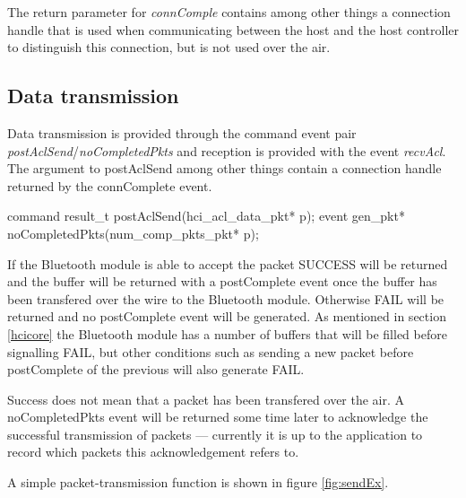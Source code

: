 \documentclass[a4paper,10pt]{article}
\begin{document}
The return parameter for \emph{connComple} contains among other things
a connection handle that is used when communicating between the host
and the host controller to distinguish this connection, but is not
used over the air.

\subsection{Data transmission}
Data transmission is provided through the command event pair
\emph{postAclSend}/\emph{noCompletedPkts} and reception is provided
with the event \emph{recvAcl}. The argument to postAclSend among other
things contain a connection handle returned by the connComplete event.

\begin{boxedverbatim}
command result_t postAclSend(hci_acl_data_pkt* p);
event gen_pkt* noCompletedPkts(num_comp_pkts_pkt* p);
\end{boxedverbatim}

If the Bluetooth module is able to accept the packet SUCCESS will be
returned and the buffer will be returned with a postComplete event
once the buffer has been transfered over the wire to the Bluetooth
module. Otherwise FAIL will be returned and no postComplete event will
be generated. As mentioned in section \ref{hcicore} the Bluetooth
module has a number of buffers that will be filled before signalling
FAIL, but other conditions such as sending a new packet before
postComplete of the previous will also generate FAIL.

Success does not mean that a packet has been transfered over the air.
A noCompletedPkts event will be returned some time later to
acknowledge the successful transmission of packets --- currently it is
up to the application to record which packets this acknowledgement
refers to.

A simple packet-transmission function is shown in figure \ref{fig:sendEx}.
\end{document}
